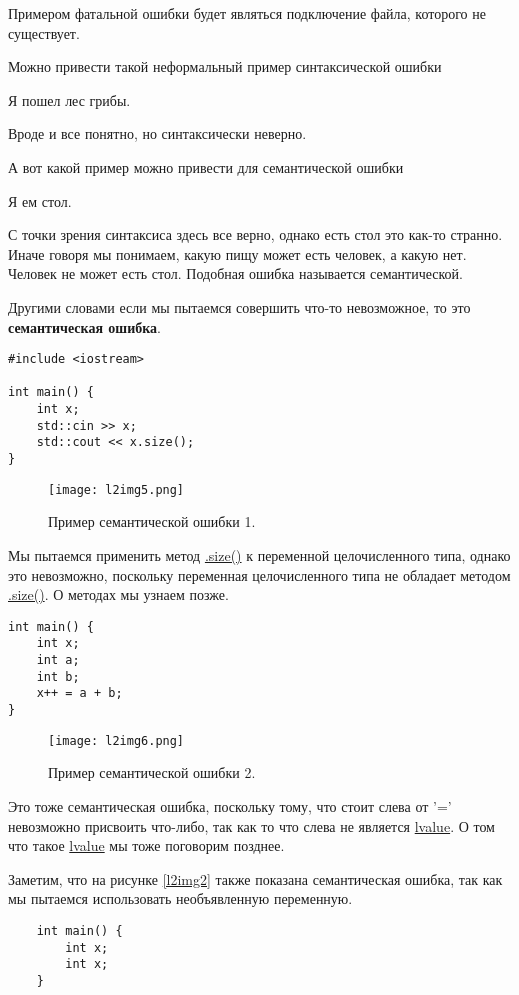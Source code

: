 Примером фатальной ошибки будет являться подключение файла, которого не существует.

Можно привести такой неформальный пример синтаксической ошибки
\begin{center}
Я пошел лес грибы.
\end{center}
Вроде и все понятно, но синтаксически неверно.

А вот какой пример можно привести для семантической ошибки
\begin{center}
Я ем стол.
\end{center}
С точки зрения синтаксиса здесь все верно, однако есть стол это как-то странно.
Иначе говоря мы понимаем, какую пищу может есть человек, а какую нет. Человек не может есть стол.
Подобная ошибка называется семантической.

Другими словами если мы пытаемся совершить что-то невозможное, то это \textbf{семантическая ошибка}.

\begin{verbatim}
#include <iostream>

int main() {
    int x;
    std::cin >> x;
    std::cout << x.size();
}
\end{verbatim}

\begin{figure}[h]
    \centering
    \texttt{[image: l2img5.png]}
    \caption{Пример семантической ошибки 1.}
    \label{l2img5}
\end{figure}

Мы пытаемся применить метод \underline{.size()} к переменной целочисленного типа,
однако это невозможно, поскольку переменная целочисленного типа не обладает методом \underline{.size()}.
О методах мы узнаем позже.

\begin{verbatim}
int main() {
    int x;
    int a;
    int b;
    x++ = a + b;
}
\end{verbatim}

\begin{figure}[h]
    \centering
    \texttt{[image: l2img6.png]}
    \caption{Пример семантической ошибки 2.}
    \label{l2img6}
\end{figure}

Это тоже семантическая ошибка, поскольку тому, что стоит слева от '='
невозможно присвоить что-либо, так как то что слева не является \underline{lvalue}.
О том что такое \underline{lvalue} мы тоже поговорим позднее.

Заметим, что на рисунке \ref{l2img2} также показана семантическая ошибка, так как мы пытаемся использовать необъявленную переменную.
\begin{verbatim}
    int main() {
        int x;
        int x;
    }
\end{verbatim}

